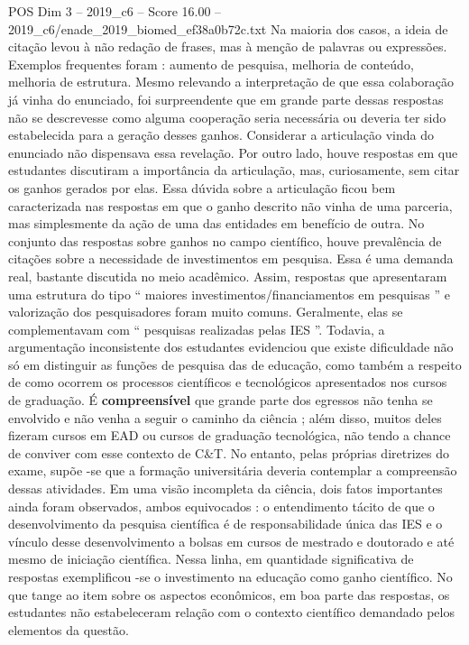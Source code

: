 \begin{textsample}{POS Dim 3 – 2019\_c6 – Score 16.00 – 2019\_c6/enade\_2019\_biomed\_ef38a0b72c.txt}
Na maioria dos casos, a ideia de citação levou à não redação de frases, mas à menção de palavras ou expressões.
Exemplos frequentes foram : aumento de pesquisa, melhoria de conteúdo, melhoria de estrutura.
Mesmo relevando a interpretação de que essa colaboração já vinha do enunciado, foi surpreendente que em grande parte dessas respostas não se descrevesse como alguma cooperação seria necessária ou deveria ter sido estabelecida para a geração desses ganhos.
Considerar a articulação vinda do enunciado não dispensava essa revelação.
Por outro lado, houve respostas em que estudantes discutiram a importância da articulação, mas, curiosamente, sem citar os ganhos gerados por elas.
Essa dúvida sobre a articulação ficou bem caracterizada nas respostas em que o ganho descrito não vinha de uma parceria, mas simplesmente da ação de uma das entidades em benefício de outra.
No conjunto das respostas sobre ganhos no campo científico, houve prevalência de citações sobre a necessidade de investimentos em pesquisa.
Essa é uma demanda real, bastante discutida no meio acadêmico.
Assim, respostas que apresentaram uma estrutura do tipo “ maiores investimentos/financiamentos em pesquisas ” e valorização dos pesquisadores foram muito comuns.
Geralmente, elas se complementavam com “ pesquisas realizadas pelas IES ”.
Todavia, a argumentação inconsistente dos estudantes evidenciou que existe dificuldade não só em distinguir as funções de pesquisa das de educação, como também a respeito de como ocorrem os processos científicos e tecnológicos apresentados nos cursos de graduação.
É \textbf{compreensível} que grande parte dos egressos não tenha se envolvido e não venha a seguir o caminho da ciência ; além disso, muitos deles fizeram cursos em EAD ou cursos de graduação tecnológica, não tendo a chance de conviver com esse contexto de C\&T.
No entanto, pelas próprias diretrizes do exame, supõe -se que a formação universitária deveria contemplar a compreensão dessas atividades.
Em uma visão incompleta da ciência, dois fatos importantes ainda foram observados, ambos equivocados : o entendimento tácito de que o desenvolvimento da pesquisa científica é de responsabilidade única das IES e o vínculo desse desenvolvimento a bolsas em cursos de mestrado e doutorado e até mesmo de iniciação científica.
Nessa linha, em quantidade significativa de respostas exemplificou -se o investimento na educação como ganho científico.
No que tange ao item sobre os aspectos econômicos, em boa parte das respostas, os estudantes não estabeleceram relação com o contexto científico demandado pelos elementos da questão.

\end{textsample}
